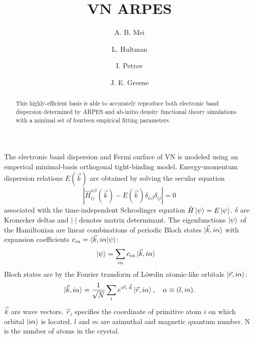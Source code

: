 \documentclass[twocolumn,showpacs,preprintnumbers,superscriptaddress,prb,floatfix,aps,10pt]{revtex4-1}
\newcommand*{\ham}{\hat{H}}
\newcommand*{\bloch}{\ket{\vec{k}, i\alpha}}
\newcommand*{\lowdin}{\ket{\vec{r}, i\alpha}}
\begin{document}

\title{VN ARPES}

\author{A. B. Mei}

\author{L. Hultman}

\author{I. Petrov}

\author{J. E. Greene}

\begin{abstract}

This highly-efficient basis is able to accurately reproduce both electronic band dispersion determined by ARPES and ab-initio density functional theory simulations with a minimal set of fourteen empirical fitting parameters.
\end{abstract}

\maketitle

The electronic band dispersion and Fermi surface of VN is modeled using an emperical minimal-basis orthogonal tight-binding model. Energy-momentum dispersion relations $E(\vec{k})$ are obtained by solving the secular equation
\begin{equation}
\label{eq:secular}
\left| \ham^{\alpha\beta}_{ij}(\vec{k}) - E(\vec{k})\delta_{\alpha\beta}\delta_{ij} \right| = 0
\end{equation}
%
associated with the time-independent Schrodinger equation $\hat{H} \ket{\psi} = E \ket{\psi}$. $\delta$ are Kronecker deltas and $|\cdot |$ denotes matrix determinant. The eigenfunctions $\ket{\psi}$ of the Hamiltonian are linear combinations of periodic Bloch states $\bloch$ with expansion coefficients
$c_{i\alpha} = \braket{\vec{k},i\alpha | \psi}$:
\begin{align}
\ket{\psi}  &= \sum_{i\alpha} c_{i\alpha} \bloch
\end{align}
%
Bloch states are by the Fourier transform of L\"{o}wdin atomic-like orbitals $\lowdin$:
\begin{equation}
\bloch = \frac{1}{\sqrt{N}} \sum_i e^{i\vec{r}_i\cdot\vec{k}} \lowdin, 
\quad
\alpha \equiv (l,m).
\end{equation}
%
$\vec{k}$ are wave vectors. $\vec{r}_i$ specifies the coordinate of primitive atom $i$ on which orbital $\ket{i\alpha}$ is located. $l$ and $m$ are azimuthal and magnetic quantum number. N is the number of atoms in the crystal.
\end{document}
